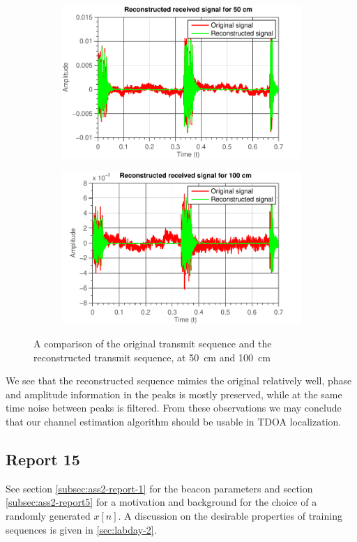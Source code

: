 \documentclass[11pt,titlepage]{report}
\begin{document}
\begin{figure}[H]
	\centering
	\begin{subfigure}{0.49\textwidth}
		\includegraphics[width=\textwidth]{../../deliverable-7-resources/figures/ass-1/report-14-15/ass-1-report-14-50cm-reconstruction.pdf}
	\end{subfigure}
	\begin{subfigure}{0.49\textwidth}
		\includegraphics[width=\textwidth]{../../deliverable-7-resources/figures/ass-1/report-14-15/ass-1-report-14-100cm-reconstruction.pdf}
	\end{subfigure}
	\caption{A comparison of the original transmit sequence and the reconstructed transmit sequence, at \SI{50}{cm} and \SI{100}{cm}}
	\label{fig:rep14-comparison}
\end{figure}

We see that the reconstructed sequence mimics the original relatively well, phase and amplitude information in the peaks is mostly preserved, while at the same time noise between peaks is filtered. From these observations we may conclude that our channel estimation algorithm should be usable in TDOA localization.

\subsection{Report 15}
See section \ref{subsec:ass2-report-1} for the beacon parameters and section \ref{subsec:ass2-report5} for a motivation and background for the choice of a randomly generated $x[n]$. A discussion on the desirable properties of training sequences is given in \ref{sec:labday-2}.
\end{document}
